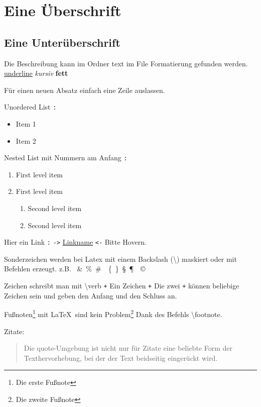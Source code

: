 \section{Eine Überschrift}
\subsection{Eine Unterüberschrift}

Die Beschreibung kann im Ordner text im File Formatierung gefunden werden.
\underline{underline} \textit{kursiv} \textbf{fett}

Für einen neuen Absatz einfach eine Zeile auslassen.

Unordered List \verb-:-
\begin{itemize}
    \item  Item 1
    \item  Item 2
\end{itemize}

Nested List mit Nummern am Anfang \verb-:-
\begin{enumerate}
    \item First level item
    \item First level item
    \begin{enumerate}
        \item Second level item
        \item Second level item
    \end{enumerate}
\end{enumerate}

Hier ein Link \verb-:- \verb+->+
\href{http://detexify.kirelabs.org/classify.html}{Linkname}
\verb+<-+ Bitte Hovern.

Sonderzeichen werden bei Latex mit einem Backslash (\textbackslash) maskiert oder mit Befehlen erzeugt. z.B. \textdollar\ \&\ \%\ \#\ \textbar\ \{\ \}\ \S\ \P\ \textbullet\ \copyright\

Zeichen schreibt man mit \textbackslash verb \verb-+- Ein Zeichen \verb-+- Die zwei \verb-+- können
beliebige Zeichen sein und geben den Anfang und den Schluss an.

Fußnoten\footnote{Die erste Fußnote} mit \LaTeX\ sind kein Problem\footnote{Die zweite Fußnote} Dank des Befehls \textbackslash footnote.

Zitate:

\begin{quote}
    Die quote-Umgebung ist nicht nur für Zitate eine beliebte Form
    der Texthervorhebung, bei der der Text beidseitig eingerückt wird.
\end{quote}


